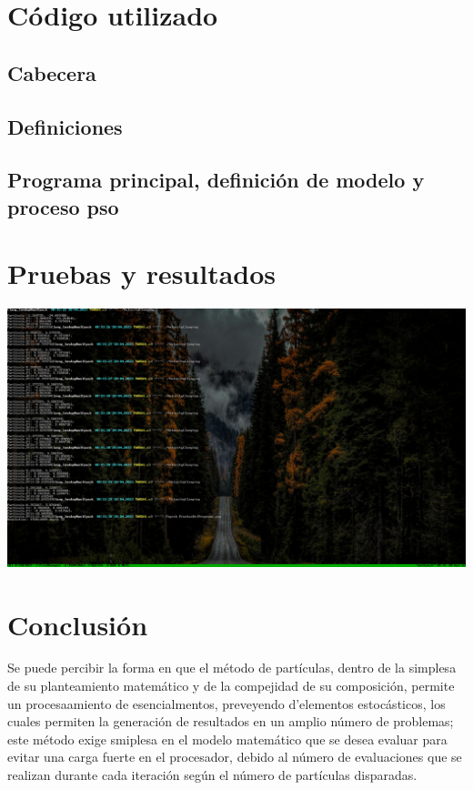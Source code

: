 \documentclass[12pt,letterpaper]{report}
\begin{document}
  \section*{Código utilizado}
  \subsection*{Cabecera}
  
  \subsection*{Definiciones}
  
  \subsection*{Programa principal, definición de modelo y proceso pso}
  
  \section*{Pruebas y resultados}
  \includegraphics[scale=0.45,trim= 0 7cm 38cm 0,clip]{../PruebasDelPrograma}
  \section*{Conclusión}
  Se puede percibir la forma en que el método de partículas, dentro de la simplesa de su planteamiento matemático
  y de la compejidad de su composición, permite un procesaamiento de esencialmentos, preveyendo d'elementos
  estocásticos, los cuales permiten la generación de resultados en un amplio número de problemas; este método
  exige smiplesa en el modelo matemático que se desea evaluar para evitar una carga fuerte en el procesador, debido
  al número de evaluaciones que se realizan durante cada iteración según el número de partículas disparadas.
\end{document}
